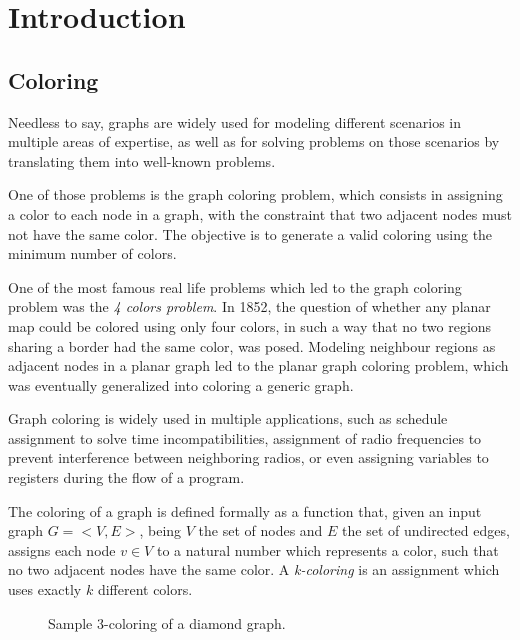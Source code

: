 
\chapter{Introduction}
\label{sec:introduction}

\section{Coloring}

Needless to say, graphs are widely used for modeling different scenarios in multiple areas of expertise, as well as for solving problems on those scenarios by translating them into well-known problems. 

One of those problems is the graph coloring problem, which consists in assigning a color to each node in a graph, with the constraint that two adjacent nodes must not have the same color. The objective is to generate a valid coloring using the minimum number of colors.

One of the most famous real life problems which led to the graph coloring problem was the \textit{4 colors problem}. In 1852, the question of whether any planar map could be colored using only four colors, in such a way that no two regions sharing a border had the same color, was posed. Modeling neighbour regions as adjacent nodes in a planar graph led to the planar graph coloring problem, which was eventually generalized into coloring a generic graph.

Graph coloring is widely used in multiple applications, such as schedule assignment to solve time incompatibilities, assignment of radio frequencies to prevent interference between neighboring radios, or even assigning variables to registers during the flow of a program.

The coloring of a graph is defined formally as a function that, given an input graph $G = <V,E>$, being $V$ the set of nodes and $E$ the set of undirected edges, assigns each node $v \in V$ to a natural number which represents a color, such that no two adjacent nodes have the same color. A \textit{k-coloring} is an assignment which uses exactly $k$ different colors.

\begin{figure}[h]
	\centering
\caption{Sample 3-coloring of a diamond graph.}
	\label{fig:samplecoloring}
\end{figure}

